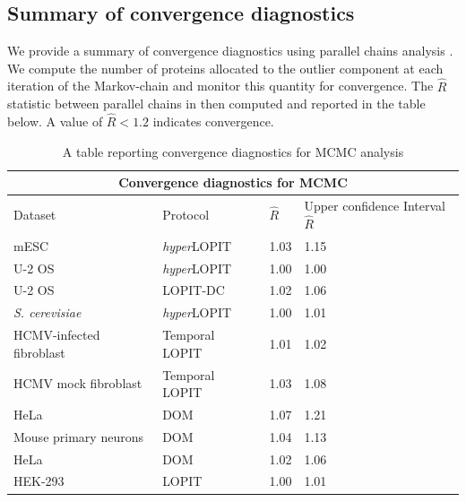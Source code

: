 \documentclass[12pt,english]{article}
\begin{document}
\subsection{Summary of convergence diagnostics}
We provide a summary of convergence diagnostics using parallel chains analysis \citep{Gelman:1992}. We compute the number of proteins allocated to the outlier component at each iteration of the Markov-chain and monitor this quantity for convergence. The $\hat{R}$ statistic between parallel chains in then computed and reported in the table below. A value of $\hat{R} < 1.2$ indicates convergence.
\begin{table}[h]
	\centering
	\footnotesize
	\begin{tabular}{ |p{5cm}|p{3cm}|p{2cm}|p{4cm}|  }
		\hline
		\multicolumn{4}{|c|}{Convergence diagnostics for MCMC} \\
		\hline
		\vfill\hfil Dataset & \vfill\hfil Protocol & \vfill\hfil$\hat{R}$ & \vfill\hfil Upper confidence Interval \vfill\hfil $\hat{R}$   \\
		\hline
		\hline
		mESC  & \textit{hyper}LOPIT&\vfill\hfil 1.03 & \vfill\hfil 1.15 \\
		\hline
		U-2 OS &\textit{hyper}LOPIT & \vfill\hfil 1.00  & \vfill\hfil 1.00\\
		\hline
		U-2 OS &LOPIT-DC  & \vfill\hfil 1.02&\vfill\hfil 1.06\\
		\hline
		\textit{S. cerevisiae} &\textit{hyper}LOPIT & \vfill\hfil 1.00 & \vfill\hfil 1.01\\
		\hline
		HCMV-infected fibroblast& Temporal LOPIT &  \vfill\hfil 1.01 & \vfill\hfil 1.02 \\
		\hline
		HCMV mock fibroblast& Temporal LOPIT &  \vfill\hfil 1.03 & \vfill\hfil 1.08 \\
		\hline
		HeLa \citep{Itzhak:2016}& DOM &  \vfill\hfil 1.07 & \vfill\hfil 1.21 \\
		\hline
		Mouse primary neurons & DOM &  \vfill\hfil 1.04 & \vfill\hfil 1.13 \\
		\hline
		HeLa \citep{Hirst:2018} & DOM &\vfill\hfil 1.02 & \vfill\hfil 1.06 \\
		\hline
		HEK-293 &LOPIT &  \vfill\hfil 1.00 & \vfill\hfil 1.01 \\
		\hline
		\hline
	\end{tabular}
	\caption{A table reporting convergence diagnostics for MCMC analysis}
	\label{table:mcmcconvergence}
\end{table}
 



\clearpage


\end{document}

